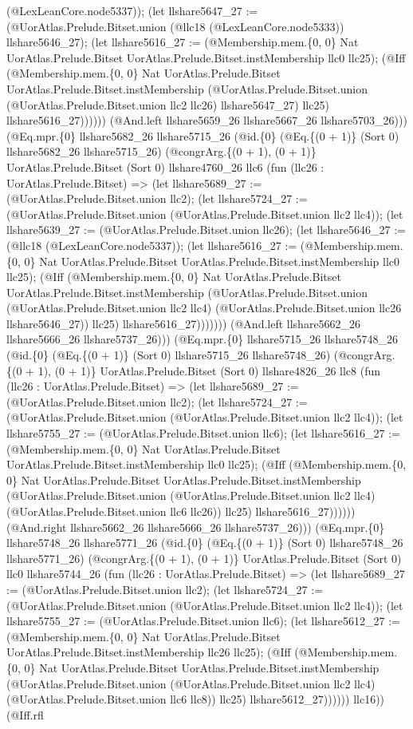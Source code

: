 \documentclass[11pt]{article}
\begin{document}
(@LexLeanCore.node5337)); (let llshare5647\_27 := (@UorAtlas.Prelude.Bitset.union (@llc18 (@LexLeanCore.node5333)) llshare5646\_27); (let llshare5616\_27 := (@Membership.mem.\{0, 0\} Nat UorAtlas.Prelude.Bitset UorAtlas.Prelude.Bitset.instMembership llc0 llc25); (@Iff (@Membership.mem.\{0, 0\} Nat UorAtlas.Prelude.Bitset UorAtlas.Prelude.Bitset.instMembership (@UorAtlas.Prelude.Bitset.union (@UorAtlas.Prelude.Bitset.union llc2 llc26) llshare5647\_27) llc25) llshare5616\_27)))))) (@And.left llshare5659\_26 llshare5667\_26 llshare5703\_26))) (@Eq.mpr.\{0\} llshare5682\_26 llshare5715\_26 (@id.\{0\} (@Eq.\{(0 + 1)\} (Sort 0) llshare5682\_26 llshare5715\_26) (@congrArg.\{(0 + 1), (0 + 1)\} UorAtlas.Prelude.Bitset (Sort 0) llshare4760\_26 llc6 (fun (llc26 : UorAtlas.Prelude.Bitset) => (let llshare5689\_27 := (@UorAtlas.Prelude.Bitset.union llc2); (let llshare5724\_27 := (@UorAtlas.Prelude.Bitset.union (@UorAtlas.Prelude.Bitset.union llc2 llc4)); (let llshare5639\_27 := (@UorAtlas.Prelude.Bitset.union llc26); (let llshare5646\_27 := (@llc18 (@LexLeanCore.node5337)); (let llshare5616\_27 := (@Membership.mem.\{0, 0\} Nat UorAtlas.Prelude.Bitset UorAtlas.Prelude.Bitset.instMembership llc0 llc25); (@Iff (@Membership.mem.\{0, 0\} Nat UorAtlas.Prelude.Bitset UorAtlas.Prelude.Bitset.instMembership (@UorAtlas.Prelude.Bitset.union (@UorAtlas.Prelude.Bitset.union llc2 llc4) (@UorAtlas.Prelude.Bitset.union llc26 llshare5646\_27)) llc25) llshare5616\_27))))))) (@And.left llshare5662\_26 llshare5666\_26 llshare5737\_26))) (@Eq.mpr.\{0\} llshare5715\_26 llshare5748\_26 (@id.\{0\} (@Eq.\{(0 + 1)\} (Sort 0) llshare5715\_26 llshare5748\_26) (@congrArg.\{(0 + 1), (0 + 1)\} UorAtlas.Prelude.Bitset (Sort 0) llshare4826\_26 llc8 (fun (llc26 : UorAtlas.Prelude.Bitset) => (let llshare5689\_27 := (@UorAtlas.Prelude.Bitset.union llc2); (let llshare5724\_27 := (@UorAtlas.Prelude.Bitset.union (@UorAtlas.Prelude.Bitset.union llc2 llc4)); (let llshare5755\_27 := (@UorAtlas.Prelude.Bitset.union llc6); (let llshare5616\_27 := (@Membership.mem.\{0, 0\} Nat UorAtlas.Prelude.Bitset UorAtlas.Prelude.Bitset.instMembership llc0 llc25); (@Iff (@Membership.mem.\{0, 0\} Nat UorAtlas.Prelude.Bitset UorAtlas.Prelude.Bitset.instMembership (@UorAtlas.Prelude.Bitset.union (@UorAtlas.Prelude.Bitset.union llc2 llc4) (@UorAtlas.Prelude.Bitset.union llc6 llc26)) llc25) llshare5616\_27)))))) (@And.right llshare5662\_26 llshare5666\_26 llshare5737\_26))) (@Eq.mpr.\{0\} llshare5748\_26 llshare5771\_26 (@id.\{0\} (@Eq.\{(0 + 1)\} (Sort 0) llshare5748\_26 llshare5771\_26) (@congrArg.\{(0 + 1), (0 + 1)\} UorAtlas.Prelude.Bitset (Sort 0) llc0 llshare5744\_26 (fun (llc26 : UorAtlas.Prelude.Bitset) => (let llshare5689\_27 := (@UorAtlas.Prelude.Bitset.union llc2); (let llshare5724\_27 := (@UorAtlas.Prelude.Bitset.union (@UorAtlas.Prelude.Bitset.union llc2 llc4)); (let llshare5755\_27 := (@UorAtlas.Prelude.Bitset.union llc6); (let llshare5612\_27 := (@Membership.mem.\{0, 0\} Nat UorAtlas.Prelude.Bitset UorAtlas.Prelude.Bitset.instMembership llc26 llc25); (@Iff (@Membership.mem.\{0, 0\} Nat UorAtlas.Prelude.Bitset UorAtlas.Prelude.Bitset.instMembership (@UorAtlas.Prelude.Bitset.union (@UorAtlas.Prelude.Bitset.union llc2 llc4) (@UorAtlas.Prelude.Bitset.union llc6 llc8)) llc25) llshare5612\_27)))))) llc16)) (@Iff.rfl 
\end{document}
